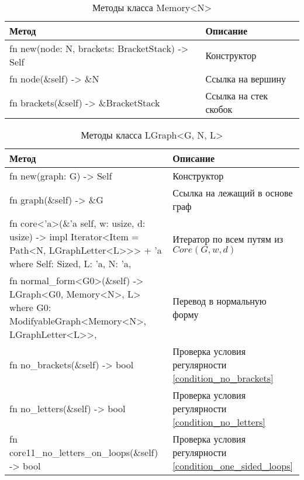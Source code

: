 \begin{table}
    \caption{Методы класса Memory<N>}
    \label{class_MemoryN_api}
    \begin{tabular}{|m{20em}|m{20em}|}
        \hline
        \textbf{Метод} & \textbf{Описание}\\
        \hline
            fn new(node: N, brackets: BracketStack) -> Self & Конструктор \\
        \hline
            fn node(\&self) -> \&N & Ссылка на вершину \\
        \hline
            fn brackets(\&self) -> \&BracketStack & Ссылка на стек скобок \\
        \hline
    \end{tabular}
\end{table}

\begin{table}
    \caption{Методы класса LGraph<G, N, L>}
    \label{class_LGraphGNL_api}
    \begin{tabular}{|m{20em}|m{20em}|}
        \hline
        \textbf{Метод} & \textbf{Описание}\\
        \hline
            fn new(graph: G) -> Self & Конструктор \\
        \hline
            fn graph(\&self) -> \&G & Ссылка на лежащий в основе граф \\
        \hline
            fn core<'a>(\&'a self, w: usize, d: usize) -> impl Iterator<Item = Path<N, LGraphLetter<L>{}>{}> + 'a \newline
            where Self: Sized, L: 'a, N: 'a, & Итератор по всем путям из $Core(G, w, d)$ \\
        \hline
            fn normal\_form<G0>(\&self) -> LGraph<G0, Memory<N>, L> \newline 
            where G0: ModifyableGraph<Memory<N>, LGraphLetter<L>{}>, & Перевод в нормальную форму \\
        \hline
            fn no\_brackets(\&self) -> bool & Проверка условия регулярности \ref{condition_no_brackets} \\
        \hline
            fn no\_letters(\&self) -> bool & Проверка условия регулярности \ref{condition_no_letters} \\
        \hline
            fn core11\_no\_letters\_on\_loops(\&self) -> bool & Проверка условия регулярности \ref{condition_one_sided_loops} \\
        \hline
    \end{tabular}
\end{table}

